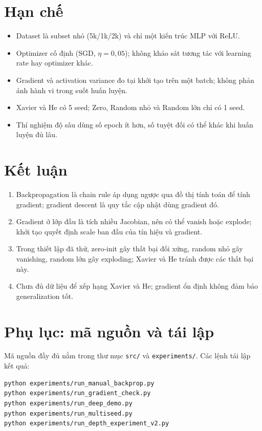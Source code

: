 \documentclass[12pt,a4paper]{article}
\begin{document}
\section{Hạn chế}
\begin{itemize}
  \item Dataset là subset nhỏ (5k/1k/2k) và chỉ một kiến trúc MLP với ReLU.
  \item Optimizer cố định (SGD, $\eta=0{,}05$); không khảo sát tương tác với learning rate hay optimizer khác.
  \item Gradient và activation variance đo tại khởi tạo trên một batch; không phản ánh hành vi trong suốt huấn luyện.
  \item Xavier và He có 5 seed; Zero, Random nhỏ và Random lớn chỉ có 1 seed.
  \item Thí nghiệm độ sâu dùng số epoch ít hơn, số tuyệt đối có thể khác khi huấn luyện đủ lâu.
\end{itemize}

\section{Kết luận}
\begin{enumerate}
  \item Backpropagation là chain rule áp dụng ngược qua đồ thị tính toán để tính gradient; gradient descent là quy tắc cập nhật dùng gradient đó.
  \item Gradient ở lớp đầu là tích nhiều Jacobian, nên có thể vanish hoặc explode; khởi tạo quyết định scale ban đầu của tín hiệu và gradient.
  \item Trong thiết lập đã thử, zero-init gây thất bại đối xứng, random nhỏ gây vanishing, random lớn gây exploding; Xavier và He tránh được các thất bại này.
  \item Chưa đủ dữ liệu để xếp hạng Xavier và He; gradient ổn định không đảm bảo generalization tốt.
\end{enumerate}

\appendix
\section{Phụ lục: mã nguồn và tái lập}
Mã nguồn đầy đủ nằm trong thư mục \texttt{src/} và \texttt{experiments/}. Các lệnh tái lập kết quả:
\begin{lstlisting}[language=bash,caption={Lệnh tái lập}]
python experiments/run_manual_backprop.py
python experiments/run_gradient_check.py
python experiments/run_deep_demo.py
python experiments/run_multiseed.py
python experiments/run_depth_experiment_v2.py
\end{lstlisting}
\end{document}

